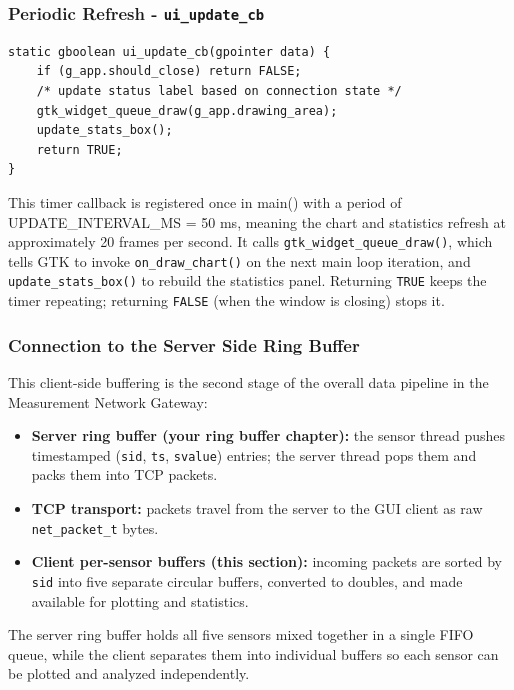 \subsubsection{Periodic Refresh - \texttt{ui\_update\_cb}}
\begin{verbatim}
static gboolean ui_update_cb(gpointer data) {
    if (g_app.should_close) return FALSE;
    /* update status label based on connection state */
    gtk_widget_queue_draw(g_app.drawing_area);
    update_stats_box();
    return TRUE;
}
\end{verbatim}
This timer callback is registered once in main() with a period of UPDATE\_INTERVAL\_MS = 50 ms, meaning the chart and statistics refresh at approximately 20 frames per second. It calls \texttt{gtk\_widget\_queue\_draw()}, which tells GTK to invoke \texttt{on\_draw\_chart()} on the next main loop iteration, and \texttt{update\_stats\_box()} to rebuild the statistics panel. Returning \texttt{TRUE} keeps the timer repeating; returning \texttt{FALSE} (when the window is closing) stops it.

\subsubsection{Connection to the Server Side Ring Buffer}
This client-side buffering is the second stage of the overall data pipeline in the
Measurement Network Gateway:

\begin{itemize}
    \item \textbf{Server ring buffer (your ring buffer chapter):} the sensor thread
    pushes timestamped (\texttt{sid}, \texttt{ts}, \texttt{svalue}) entries; the server
    thread pops them and packs them into TCP packets.

    \item \textbf{TCP transport:} packets travel from the server to the GUI client as
    raw \texttt{net\_packet\_t} bytes.

    \item \textbf{Client per-sensor buffers (this section):} incoming packets are sorted
    by \texttt{sid} into five separate circular buffers, converted to doubles, and made
    available for plotting and statistics.
\end{itemize}

The server ring buffer holds all five sensors mixed together in a single FIFO queue,
while the client separates them into individual buffers so each sensor can be plotted
and analyzed independently.

